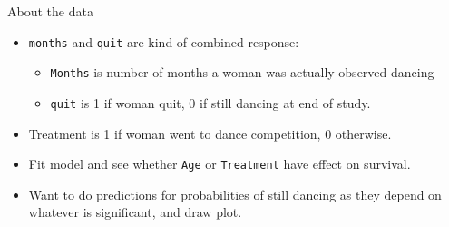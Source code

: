 \begin{frame}[fragile]{About the data}

  \begin{itemize}
  \item \verb-months- and \verb-quit- are kind of combined response:
    \begin{itemize}
    \item  \verb-Months- is number of months a woman was actually observed dancing
    \item \verb-quit- is 1 if woman quit, 0 if still dancing at end of study.
    \end{itemize}
  \item Treatment is 1 if woman went to dance competition, 0 otherwise.
  \item Fit model and see whether \texttt{Age} or \texttt{Treatment}
    have effect on survival.
  \item Want to do predictions for probabilities of still dancing as
    they depend on whatever is significant, and draw plot.
\end{itemize}
\end{frame}


